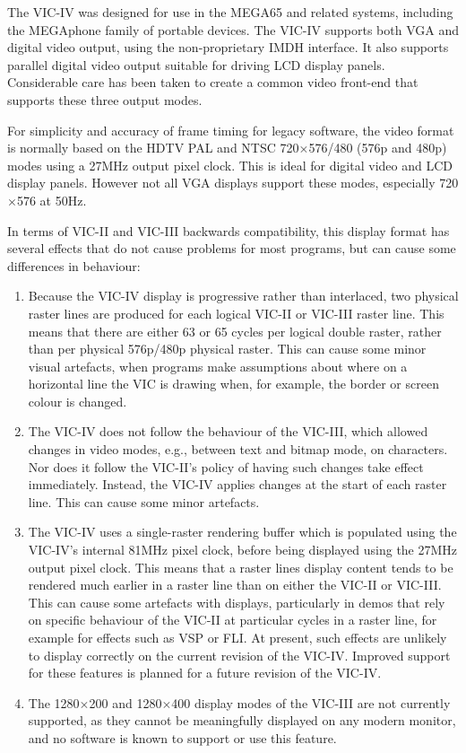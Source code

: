 The VIC-IV was designed for use in the MEGA65 and related systems, including the MEGAphone family of portable devices.
The VIC-IV supports both VGA and digital video output, using the
non-proprietary IMDH\texttrademark{} interface.
It also supports parallel digital video output suitable for driving LCD display
panels.  Considerable care has been taken to create a common video front-end that supports these three output modes.

For simplicity and accuracy of frame timing for legacy software, the video format is normally based on the HDTV PAL and NTSC 720$\times$576/480 (576p and 480p) modes using a 27MHz output pixel clock.  This is ideal for digital video and LCD display panels. However not all VGA displays support
these modes, especially 720$\times$576 at 50Hz.

In terms of VIC-II and VIC-III backwards compatibility, this display format has several effects that do not cause problems for most programs, but can cause some differences in behaviour:

\begin{enumerate}
\item Because the VIC-IV display is progressive rather than interlaced, two physical raster lines are produced for each logical VIC-II or VIC-III raster line.  This means that there are either 63 or 65 cycles per logical double raster, rather than per physical 576p/480p physical raster. This can cause some minor visual artefacts, when programs make assumptions about where on a horizontal line the VIC is drawing when, for example, the border or screen colour is changed.
\item The VIC-IV does not follow the behaviour of the VIC-III, which allowed changes in video modes, e.g., between text and bitmap mode, on characters.  Nor does it follow the VIC-II's policy of having such changes take effect immediately.  Instead, the VIC-IV applies changes at the start of each raster line.  This can cause some minor artefacts.
\item The VIC-IV uses a single-raster rendering buffer which is populated using the VIC-IV's internal 81MHz pixel clock, before being displayed using the 27MHz output pixel clock.  This means that a raster lines display content tends to be rendered much earlier in a raster line than on either the VIC-II or VIC-III.  This can cause some artefacts with displays, particularly in demos that rely on specific behaviour of the VIC-II at particular cycles in a raster line, for example for effects such as VSP or FLI.  At present, such effects are unlikely to display correctly on the current revision of the VIC-IV.  Improved support for these features is planned for a future revision of the VIC-IV.
  \item The 1280$\times$200 and 1280$\times$400 display modes of the VIC-III are not currently supported, as they cannot be meaningfully displayed on any modern monitor, and no software is known to support or use this feature.
\end{enumerate}

